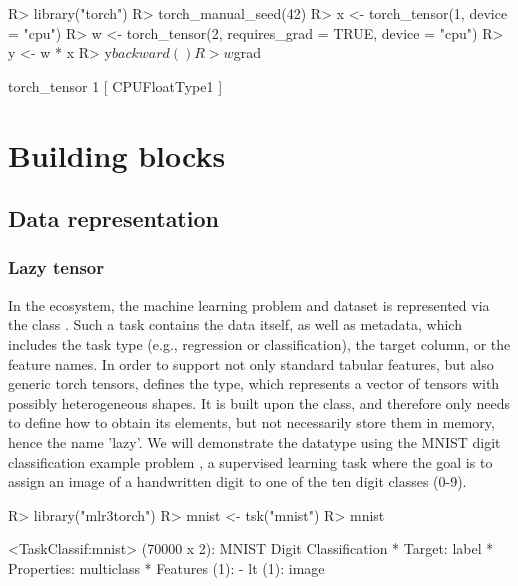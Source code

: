\documentclass[article]{jss}
\theoremstyle{definition}
\begin{document}
\begin{CodeInput}
R> library("torch")
R> torch_manual_seed(42)
R> x <- torch_tensor(1, device = "cpu")
R> w <- torch_tensor(2, requires_grad = TRUE, device = "cpu")
R> y <- w * x
R> y$backward()
R> w$grad
\end{CodeInput}
\begin{CodeOutput}
torch_tensor
 1
[ CPUFloatType{1} ]
\end{CodeOutput}

\section{Building blocks}\label{sec:building-blocks}

\subsection{Data representation}

\subsubsection{Lazy tensor}

In the  ecosystem, the machine learning problem and dataset is represented via the  class .
Such a task contains the data itself, as well as metadata, which includes the task type (e.g., regression or classification), the target column, or the feature names.
In order to support not only standard tabular features, but also generic torch tensors,  defines the  type, which represents a vector of tensors with possibly heterogeneous shapes.
It is built upon the  class, and therefore only needs to define how to obtain its elements, but not necessarily store them in memory, hence the name 'lazy'.
We will demonstrate the datatype using the MNIST digit classification example problem \citep{ref-mnist-2012}, a supervised learning task where the goal is to assign an image of a handwritten digit to one of the ten digit classes (0-9).

\begin{CodeInput}
R> library("mlr3torch")
R> mnist <- tsk("mnist")
R> mnist
\end{CodeInput}
\begin{CodeOutput}
<TaskClassif:mnist> (70000 x 2): MNIST Digit Classification
* Target: label
* Properties: multiclass
* Features (1):
  - lt (1): image
\end{CodeOutput}
\end{document}

